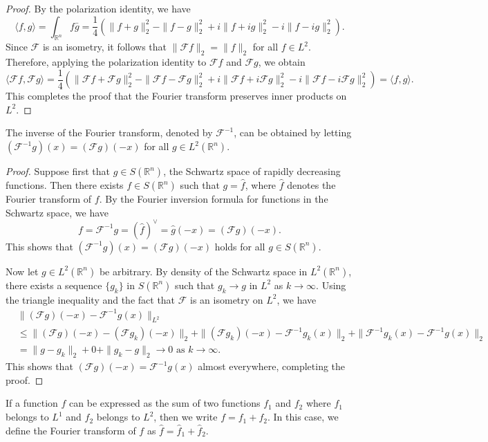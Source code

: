 \begin{proof}
    By the polarization identity, we have
$$
\langle f, g\rangle = \int_{\mathbb{R}^n} f \bar{g} = \frac{1}{4}\left(\|f+g\|_2^2 - \|f-g\|_2^2 + i\|f+ig\|_2^2 - i\|f-ig\|_2^2\right).
$$
Since $\mathcal{F}$ is an isometry, it follows that $\|\mathcal{F}f\|_2 = \|f\|_2$ for all $f \in L^2$. Therefore, applying the polarization identity to $\mathcal{F}f$ and $\mathcal{F}g$, we obtain
$$
\langle \mathcal{F}f, \mathcal{F}g\rangle = \frac{1}{4}\left(\|\mathcal{F}f+\mathcal{F}g\|_2^2 - \|\mathcal{F}f-\mathcal{F}g\|_2^2 + i\|\mathcal{F}f+i\mathcal{F}g\|_2^2 - i\|\mathcal{F}f-i\mathcal{F}g\|_2^2\right) = \langle f, g\rangle.
$$
This completes the proof that the Fourier transform preserves inner products on $L^2$.
\end{proof}
\begin{theorem}
    The inverse of the Fourier transform, denoted by $\mathcal{F}^{-1}$, can be obtained by letting $(\mathcal{F}^{-1}g)(x) = (\mathcal{F}g)(-x)$ for all $g \in L^2(\mathbb{R}^n)$.
\end{theorem}
\begin{proof}
    Suppose first that $g \in S(\mathbb{R}^n)$, the Schwartz space of rapidly decreasing functions. Then there exists $f \in S(\mathbb{R}^n)$ such that $g = \hat{f}$, where $\hat{f}$ denotes the Fourier transform of $f$. By the Fourier inversion formula for functions in the Schwartz space, we have
$$
f = \mathcal{F}^{-1}g = (\hat{f})^\vee = \hat{g}(-x) = (\mathcal{F}g)(-x).
$$
This shows that $(\mathcal{F}^{-1}g)(x) = (\mathcal{F}g)(-x)$ holds for all $g \in S(\mathbb{R}^n)$.

Now let $g \in L^2(\mathbb{R}^n)$ be arbitrary. By density of the Schwartz space in $L^2(\mathbb{R}^n)$, there exists a sequence $\{g_k\}$ in $S(\mathbb{R}^n)$ such that $g_k \to g$ in $L^2$ as $k \to \infty$. Using the triangle inequality and the fact that $\mathcal{F}$ is an isometry on $L^2$, we have
$$
\begin{aligned}
&\|(\mathcal{F}g)(-x) - \mathcal{F}^{-1}g(x)\|_{L^2} \\
&\leq \|(\mathcal{F}g)(-x) - (\mathcal{F}g_k)(-x)\|_2 + \|(\mathcal{F}g_k)(-x) - \mathcal{F}^{-1}g_k(x)\|_2 + \|\mathcal{F}^{-1}g_k(x) - \mathcal{F}^{-1}g(x)\|_2 \\
&= \|g - g_k\|_2 + 0 + \|g_k - g\|_2 \to 0 \text{ as } k \to \infty.
\end{aligned}
$$
This shows that $(\mathcal{F}g)(-x) = \mathcal{F}^{-1}g(x)$ almost everywhere, completing the proof.
\end{proof}
If a function $f$ can be expressed as the sum of two functions $f_1$ and $f_2$ where $f_1$ belongs to $L^1$ and $f_2$ belongs to $L^2$, then we write $f = f_1 + f_2$. In this case, we define the Fourier transform of $f$ as $\hat{f} = \hat{f}_1 + \hat{f}_2$.

